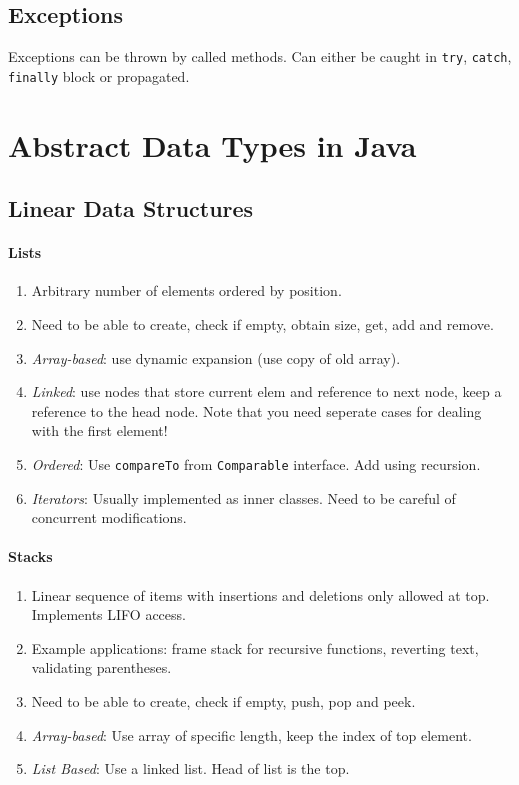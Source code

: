 \documentclass[twocolumn,english]{article}
\begin{document}
\subsection{Exceptions}

Exceptions can be thrown by called methods. Can either be caught in
\texttt{try}, \texttt{catch}, \texttt{finally} block or propagated.


\section{Abstract Data Types in Java}


\subsection{Linear Data Structures}


\paragraph{Lists}
\begin{enumerate}
\item Arbitrary number of elements ordered by position.
\item Need to be able to create, check if empty, obtain size, get, add and
remove.
\item \emph{Array-based}: use dynamic expansion (use copy of old array).
\item \emph{Linked}: use nodes that store current elem and reference to
next node, keep a reference to the head node. Note that you need seperate
cases for dealing with the first element!
\item \emph{Ordered}: Use \texttt{compareTo} from \texttt{Comparable} interface.
Add using recursion.
\item \emph{Iterators}: Usually implemented as inner classes. Need to be
careful of concurrent modifications.
\end{enumerate}

\paragraph{Stacks}
\begin{enumerate}
\item Linear sequence of items with insertions and deletions only allowed
at top. Implements LIFO access.
\item Example applications: frame stack for recursive functions, reverting
text, validating parentheses.
\item Need to be able to create, check if empty, push, pop and peek.
\item \emph{Array-based}: Use array of specific length, keep the index of
top element.
\item \emph{List Based}: Use a linked list. Head of list is the top.
\end{enumerate}
\end{document}
